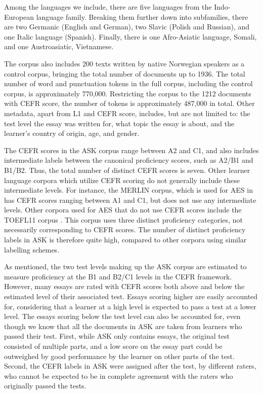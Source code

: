Among the languages we include, there are five languages from the
Indo-European language family. Breaking them further down into subfamilies,
there are two Germanic (English and German), two Slavic (Polish and Russian),
and one Italic language (Spanish). Finally, there is one Afro-Asiatic
language, Somali, and one Austroasiatic, Vietnamese.

The corpus also includes 200 texts written by native Norwegian speakers as a
control corpus, bringing the total number of documents up to 1936. The total
number of word and punctuation tokens in the full corpus, including the
control corpus, is approximately 770,000. Restricting the corpus to the 1212
documents with \ac{CEFR} score, the number of tokens is approximately 487,000
in total. Other metadata, apart from L1 and CEFR score, includes, but are not
limited to: the test level the essay was written for, what topic the essay
is about, and the learner's country of origin, age, and gender.

The CEFR scores in the ASK corpus range between A2 and C1, and also includes
intermediate labels between the canonical proficiency scores, such as A2/B1
and B1/B2. Thus, the total number of distinct CEFR scores is seven. Other
learner language corpora which utilize CEFR scoring do not generally include
these intermediate levels. For instance, the MERLIN corpus, which is used for
\ac{AES} in \autocite{vajjala18universalCEFR,hancke2013} has CEFR scores
ranging between A1 and C1, but does not use any intermediate levels. Other
corpora used for \ac{AES} that do not use CEFR scores include the TOEFL11
corpus \autocite{blanchard13}. This corpus uses three distinct proficiency
categories, not necessarily corresponding to CEFR scores. The number of
distinct proficiency labels in ASK is therefore quite high, compared to other
corpora using similar labelling schemes.

As mentioned, the two test levels making up the ASK corpus are estimated to
measure proficiency at the B1 and B2/C1 levels in the CEFR framework.
However, many essays are rated with CEFR scores both above and below the
estimated level of their associated test. Essays scoring higher are easily
accounted for, considering that a learner at a high level is expected to pass
a test at a lower level. The essays scoring below the test level can also be
accounted for, even though we know that all the documents in ASK are taken
from learners who passed their test. First, while ASK only contains essays,
the original test consisted of multiple parts, and a low score on the essay
part could be outweighed by good performance by the learner on other parts of
the test. Second, the CEFR labels in ASK were assigned after the test, by
different raters, who cannot be expected to be in complete agreement with the
raters who originally passed the tests.

